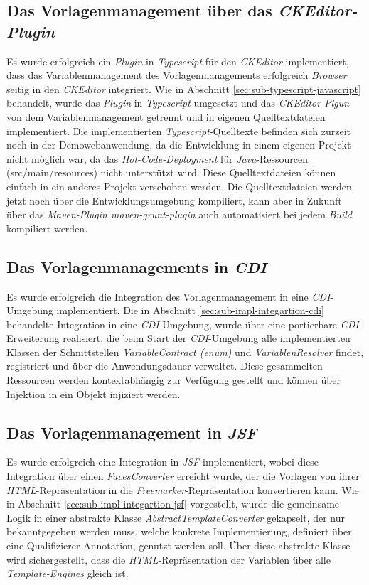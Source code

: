 \subsection{Das Vorlagenmanagement über das \emph{CKEditor-Plugin}}
Es wurde erfolgreich ein \emph{Plugin} in \emph{Typescript} für den \emph{CKEditor} implementiert, dass das Variablenmanagement des Vorlagenmanagements erfolgreich \emph{Browser} seitig in den \emph{CKEditor} integriert. Wie in Abschnitt \ref{sec:sub-typescript-javascript} behandelt, wurde das \emph{Plugin} in \emph{Typescript} umgesetzt und das \emph{CKEditor-Plgun} von dem Variablenmanagement getrennt und in eigenen Quelltextdateien implementiert. Die implementierten \emph{Typescript}-Quelltexte befinden sich zurzeit noch in der Demowebanwendung, da die Entwicklung in einem eigenen Projekt nicht möglich war, da das \emph{Hot-Code-Deployment} für \emph{Java}-Ressourcen (src/main/resources) nicht unterstützt wird. Diese Quelltextdateien können einfach in ein anderes Projekt verschoben werden. Die Quelltextdateien werden jetzt noch über die Entwicklungsumgebung kompiliert, kann aber in Zukunft über das \emph{Maven-Plugin maven-grunt-plugin} auch automatisiert bei jedem \emph{Build} kompiliert werden. 

\subsection{Das Vorlagenmanagements in \emph{CDI}}
Es wurde erfolgreich die Integration des Vorlagenmanagement in eine \emph{CDI}-Umgebung implementiert. Die in Abschnitt \ref{sec:sub-impl-integartion-cdi} behandelte Integration in eine \emph{CDI}-Umgebung, wurde über eine portierbare \emph{CDI}-Erweiterung realisiert, die beim Start der \emph{CDI}-Umgebung alle implementierten Klassen der Schnittstellen \emph{VariableContract (enum)} und \emph{VariablenResolver} findet, registriert und über die Anwendungsdauer verwaltet. Diese gesammelten Ressourcen werden kontextabhängig zur Verfügung gestellt und können über Injektion in ein Objekt injiziert werden.

\subsection{Das Vorlagenmanagement in \emph{JSF}}
Es wurde erfolgreich eine Integration in \emph{JSF} implementiert, wobei diese Integration über einen \emph{FacesConverter} erreicht wurde, der die Vorlagen von ihrer \emph{HTML}-Repräsentation in die \emph{Freemarker}-Repräsentation konvertieren kann. Wie in Abschnitt \ref{sec:sub-impl-integartion-jsf} vorgestellt, wurde die gemeinsame Logik in einer abstrakte Klasse \emph{AbstractTemplateConverter} gekapselt, der nur bekanntgegeben werden muss, welche konkrete Implementierung, definiert über eine Qualifizierer Annotation, genutzt werden soll. Über diese abstrakte Klasse wird sichergestellt, dass die \emph{HTML}-Repräsentation der Variablen über alle \emph{Template-Engines} gleich ist.

